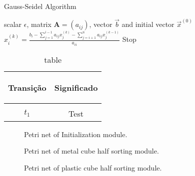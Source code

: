 \begin{algorithm2e}
\caption{Gauss-Seidel Algorithm}\label{alg:gauss-seidel}
\KwIn
{%
scalar $\epsilon$,
matrix $\mathbf{A} = (a_{ij})$,
vector $\vec{b}$
and initial vector $\vec{x}^{(0)}$
}
{
{
$
x_i^{(k)} =
\frac
{
b_i-\sum_{j=1}^{i-1}a_{ij}x_j^{(k)}
-\sum_{j=i+1}^{n}a_{ij}x_j^{(k-1)}
}%
{a_{ii}}
$\;
}
{Stop}
}
\end{algorithm2e}

\begin{table}[H]
  \centering
  \begin{tabular}{cc}
    \label{tab:tab1}
    \hypertarget{tab:1}{}
    Transição&Significado\\
    \hline \\
    \hyperlink{net:1}{$t_{1}$}&Test

  \end{tabular}
  \caption{table}
\end{table}
\OmegaSet

\clearpage



\begin{landscape}

  \begin{figure}[h]
    \centering
    \resizebox{\hsize}{!}{
      
    }
    \caption{Petri net of Initialization module.}
    \label{fig:petri_initialization}
  \end{figure}

\end{landscape}




\begin{landscape}
  \vspace*{\fill}
  \begin{figure}[h]
    \centering
    \resizebox{\hsize}{!}{
      
    }
    \caption{Petri net of metal cube half sorting module.}
    \label{fig:petri_initialization}
  \end{figure}
  \vspace*{\fill}
\end{landscape}



\begin{landscape}
  \vspace*{\fill}
  \begin{figure}[h]
    \centering
    \resizebox{\hsize}{!}{
      
    }
    \caption{Petri net of plastic cube half sorting module.}
    \label{fig:petri_initialization}
  \end{figure}
  \vspace*{\fill}
\end{landscape}

